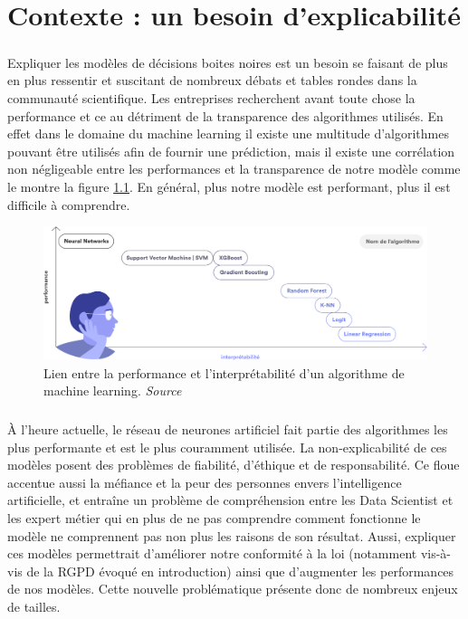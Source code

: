 \chapter{Contexte : un besoin d'explicabilité}
\paragraph{}Expliquer les modèles de décisions boites noires est un besoin se faisant de plus en plus ressentir et suscitant de nombreux débats et tables rondes dans la communauté scientifique. Les entreprises recherchent avant toute chose la performance et ce au détriment de la transparence des algorithmes utilisés. En effet dans le domaine du machine learning il existe une multitude d'algorithmes pouvant être utilisés afin de fournir une prédiction, mais il existe une corrélation non négligeable entre les performances et la transparence de notre modèle comme le montre la figure \ref{performanceAndInterpretabilite}. En général, plus notre modèle est performant, plus il est difficile à comprendre.

\begin{figure}[h]
\centering
\includegraphics[scale=0.15]{src_img/performanceAndInterpretabilite.png}
\caption{Lien entre la performance et l'interprétabilité d'un algorithme de machine learning. \textit{Source \cite{hippocrate}}}
\label{performanceAndInterpretabilite}
\end{figure}

\paragraph{}À l'heure actuelle, le réseau de neurones artificiel fait partie des algorithmes les plus performante et est le plus couramment utilisée.
La non-explicabilité de ces modèles posent des problèmes de fiabilité, d'éthique et de responsabilité. Ce floue accentue aussi la méfiance et la peur des personnes envers l'intelligence artificielle, et entraîne un problème de compréhension entre les Data Scientist et les expert métier qui en plus de ne pas comprendre comment fonctionne le modèle ne comprennent pas non plus les raisons de son résultat. Aussi, expliquer ces modèles permettrait d'améliorer notre conformité à la loi (notamment vis-à-vis de la RGPD évoqué en introduction) ainsi que d'augmenter les performances de nos modèles. Cette nouvelle problématique présente donc de nombreux enjeux de tailles.

